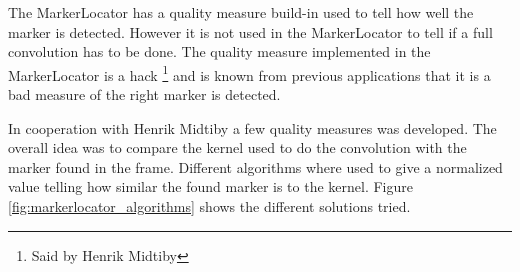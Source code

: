 The MarkerLocator has a quality measure build-in used to tell how well the marker is detected.
However it is not used in the MarkerLocator to tell if a full convolution has to be done. 
The quality measure implemented in the MarkerLocator is a hack \footnote{Said by Henrik Midtiby} and is known from previous applications that it is a bad measure of the right marker is detected.

In cooperation with Henrik Midtiby a few quality measures was developed.
The overall idea was to compare the kernel used to do the convolution with the marker found in the frame.
Different algorithms where used to give a normalized value telling how similar the found marker is to the kernel. Figure \ref{fig:markerlocator_algorithms} shows the different solutions tried.\\

